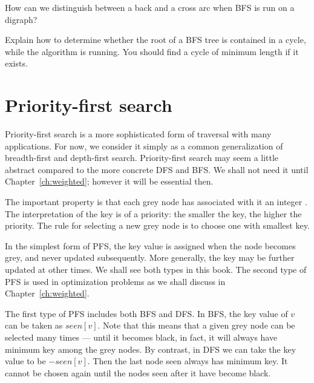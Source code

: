 \begin{Exercise}
\label{ex:BFS-back-vs-cross}

How can we distinguish between a back and a cross arc when BFS is run on
a digraph?

\end{Exercise}

\begin{Exercise}
\label{ex:BFS-cycle}

Explain how to determine whether the root of a BFS tree is contained in
a cycle, while the algorithm is running. You should find a cycle of
minimum length if it exists.

\end{Exercise}


\section{Priority-first search}
\label{sec:PFS}

Priority-first search is a more sophisticated form of traversal with
many applications. For now, we consider it simply as a common
generalization of breadth-first and depth-first search. Priority-first
search may seem a little abstract compared to the more concrete DFS and
BFS. We shall not need it until Chapter~\ref{ch:weighted}; however
it will be essential then.

The important property is that each grey node has associated with it an
integer . The interpretation of the key is of a priority: the
smaller the key, the higher the priority. The rule for selecting a new
grey node is to choose one with smallest key.  

In the simplest form of PFS, the key value is assigned when the node
becomes grey, and never updated subsequently. More generally, the key
may be further updated at other times. We shall see both types in this
book. The second type of PFS is used in optimization problems as we
shall discuss in Chapter~\ref{ch:weighted}. 

The first type of PFS includes both BFS and DFS. In BFS, the key value
of $v$ can be taken as $seen[v]$. Note that this means that a given grey
node can be selected many times --- until it becomes black, in fact, it
will always have minimum key among the grey nodes. By contrast, in DFS
we can take the key value to be $- seen[v]$. Then the last node
seen always has minimum key. It cannot be chosen again until the nodes
seen after it have become black.

